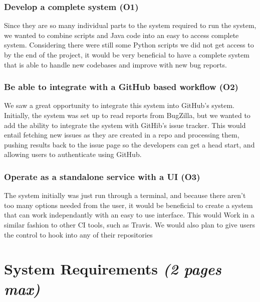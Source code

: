 \documentclass[12pt]{article}
\begin{document}
\hypertarget{develop-a-complete-system-o1}{%
\subsubsection{Develop a complete system
(O1)}\label{develop-a-complete-system-o1}}

Since they are so many individual parts to the system required to run
the system, we wanted to combine scripts and Java code into an easy to
access complete system. Considering there were still some Python scripts
we did not get access to by the end of the project, it would be very
beneficial to have a complete system that is able to handle new
codebases and improve with new bug reports.

\hypertarget{be-able-to-integrate-with-a-github-based-workflow-o2}{%
\subsubsection{Be able to integrate with a GitHub based workflow
(O2)}\label{be-able-to-integrate-with-a-github-based-workflow-o2}}

We saw a great opportunity to integrate this system into GitHub's
system. Initially, the system was set up to read reports from BugZilla,
but we wanted to add the ability to integrate the system with GitHib's
issue tracker. This would entail fetching new issues as they are created
in a repo and processing them, pushing results back to the issue page so
the developers can get a head start, and allowing users to authenticate
using GitHub.

\hypertarget{operate-as-a-standalone-service-with-a-ui-o3}{%
\subsubsection{Operate as a standalone service with a UI
(O3)}\label{operate-as-a-standalone-service-with-a-ui-o3}}

The system initially was just run through a terminal, and because there
aren't too many options needed from the user, it would be beneficial to
create a system that can work independantly with an easy to use
interface. This would Work in a similar fashion to other CI tools, such
as Travis. We would also plan to give users the control to hook into any
of their repositories

\hypertarget{system-requirements-2-pages-max}{%
\section{\texorpdfstring{System Requirements \emph{(2 pages
max)}}{System Requirements (2 pages max)}}\label{system-requirements-2-pages-max}}
\end{document}
